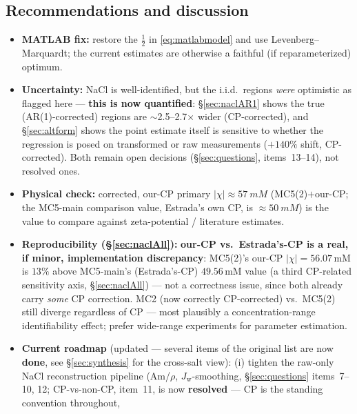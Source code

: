 \documentclass[11pt]{article}
\newcommand{\Jw}{J_{\mathrm{w}}}
\begin{document}
\subsection{Recommendations and discussion}\label{sec:naclDisc}
\begin{itemize}[itemsep=2pt]
  \item \textbf{MATLAB fix:} restore the $\tfrac12$ in \eqref{eq:matlabmodel} and
        use Levenberg--Marquardt; the current estimates are otherwise a faithful
        (if reparameterized) optimum.
  \item \textbf{Uncertainty:} NaCl is well-identified, but the i.i.d.\ regions
        \emph{were} optimistic as flagged here --- \textbf{this is now
        quantified}: \S\ref{sec:naclAR1} shows the true (AR(1)-corrected)
        regions are $\sim$2.5--2.7$\times$ wider (CP-corrected), and
        \S\ref{sec:altform}
        shows the point estimate itself is sensitive to whether the
        regression is posed on transformed or raw measurements
        ($+140\%$ shift, CP-corrected). Both remain open decisions
        (\S\ref{sec:questions}, items~13--14), not resolved ones.
  \item \textbf{Physical check:} corrected, our-CP primary
        $|\chi|\approx\SI{57}{mM}$
        (MC5(2)$+$our-CP; the MC5-main comparison value, Estrada's own CP, is
        $\approx\SI{50}{mM}$) is the
        value to compare against zeta-potential / literature estimates.
  \item \textbf{Reproducibility (\S\ref{sec:naclAll}):} \textbf{our-CP vs.\
        Estrada's-CP is a real, if minor, implementation discrepancy}: MC5(2)'s
        our-CP $|\chi|=56.07$\,mM is
        $13\%$ above MC5-main's (Estrada's-CP) $49.56$\,mM value (a third
        CP-related sensitivity axis, \S\ref{sec:naclAll}) --- not a
        correctness issue, since both already carry \emph{some} CP
        correction. MC2 (now correctly CP-corrected) vs.\ MC5(2) still
        diverge regardless of CP --- most plausibly a concentration-range
        identifiability effect; prefer wide-range experiments for parameter
        estimation.
  \item \textbf{Current roadmap} (updated --- several items of the
        original list are now \textbf{done}, see \S\ref{sec:synthesis} for the
        cross-salt view): (i) tighten the raw-only NaCl reconstruction
        pipeline (Am/$\rho$, $\Jw$-smoothing,
        \S\ref{sec:questions} items~7--10, 12; CP-vs-non-CP, item~11, is now
        \textbf{resolved} --- CP is the standing convention throughout,

\end{itemize}
\end{document}
